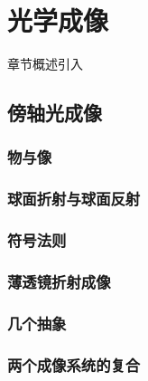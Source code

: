 \chapter{光学成像}\label{23}

章节概述引入

\section{傍轴光成像}\label{23-1}

\subsection{物与像}\label{23-1-1}

\subsection{球面折射与球面反射}\label{23-1-2}

\subsection{符号法则}\label{23-1-3}

\subsection{薄透镜折射成像}\label{23-1-4}

\subsection{几个抽象}\label{23-1-5}

\subsection{两个成像系统的复合}\label{23-1-6}